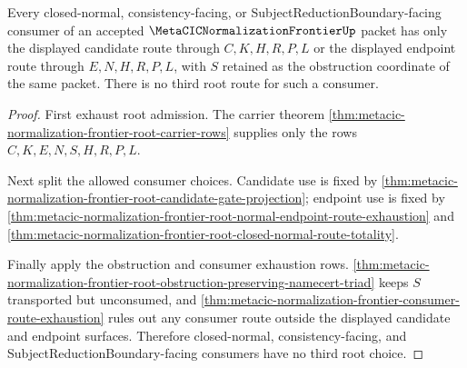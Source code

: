 \begin{theorem}
\label{thm:metacic-normalization-frontier-root-consumer-choice-boundary}
Every closed-normal, consistency-facing, or SubjectReductionBoundary-facing consumer of an accepted $\MetaCICNormalizationFrontierUp$ packet has only the displayed candidate route through $C,K,H,R,P,L$ or the displayed endpoint route through $E,N,H,R,P,L$, with $S$ retained as the obstruction coordinate of the same packet. There is no third root route for such a consumer.
\end{theorem}
\begin{proof}
First exhaust root admission. The carrier theorem \autoref{thm:metacic-normalization-frontier-root-carrier-rows} supplies only the rows $C,K,E,N,S,H,R,P,L$.

Next split the allowed consumer choices. Candidate use is fixed by \autoref{thm:metacic-normalization-frontier-root-candidate-gate-projection}; endpoint use is fixed by \autoref{thm:metacic-normalization-frontier-root-normal-endpoint-route-exhaustion} and \autoref{thm:metacic-normalization-frontier-root-closed-normal-route-totality}.

Finally apply the obstruction and consumer exhaustion rows. \autoref{thm:metacic-normalization-frontier-root-obstruction-preserving-namecert-triad} keeps $S$ transported but unconsumed, and \autoref{thm:metacic-normalization-frontier-consumer-route-exhaustion} rules out any consumer route outside the displayed candidate and endpoint surfaces. Therefore closed-normal, consistency-facing, and SubjectReductionBoundary-facing consumers have no third root choice.
\end{proof}
